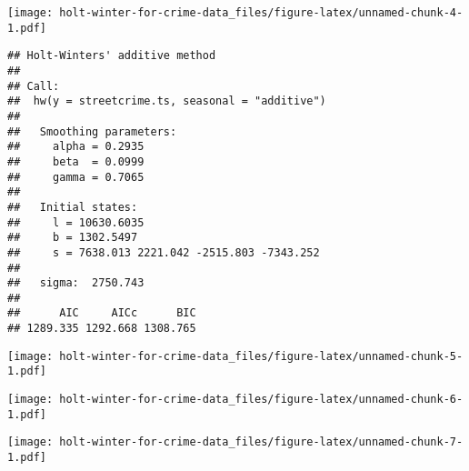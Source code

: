 \documentclass[]{article}
\newenvironment{Shaded}{\begin{snugshade}}{\end{snugshade}}
\newcommand{\CommentTok}[1]{\textcolor[rgb]{0.56,0.35,0.01}{\textit{#1}}}
\newcommand{\DataTypeTok}[1]{\textcolor[rgb]{0.13,0.29,0.53}{#1}}
\newcommand{\DecValTok}[1]{\textcolor[rgb]{0.00,0.00,0.81}{#1}}
\newcommand{\KeywordTok}[1]{\textcolor[rgb]{0.13,0.29,0.53}{\textbf{#1}}}
\newcommand{\NormalTok}[1]{#1}
\newcommand{\OperatorTok}[1]{\textcolor[rgb]{0.81,0.36,0.00}{\textbf{#1}}}
\newcommand{\StringTok}[1]{\textcolor[rgb]{0.31,0.60,0.02}{#1}}
\begin{document}
\texttt{[image: holt-winter-for-crime-data\_files/figure-latex/unnamed-chunk-4-1.pdf]}

\begin{Shaded}
\end{Shaded}

\begin{verbatim}
## Holt-Winters' additive method 
## 
## Call:
##  hw(y = streetcrime.ts, seasonal = "additive") 
## 
##   Smoothing parameters:
##     alpha = 0.2935 
##     beta  = 0.0999 
##     gamma = 0.7065 
## 
##   Initial states:
##     l = 10630.6035 
##     b = 1302.5497 
##     s = 7638.013 2221.042 -2515.803 -7343.252
## 
##   sigma:  2750.743
## 
##      AIC     AICc      BIC 
## 1289.335 1292.668 1308.765
\end{verbatim}

\begin{Shaded}
\end{Shaded}

\texttt{[image: holt-winter-for-crime-data\_files/figure-latex/unnamed-chunk-5-1.pdf]}

\begin{Shaded}
\end{Shaded}

\texttt{[image: holt-winter-for-crime-data\_files/figure-latex/unnamed-chunk-6-1.pdf]}

\begin{Shaded}
\end{Shaded}

\texttt{[image: holt-winter-for-crime-data\_files/figure-latex/unnamed-chunk-7-1.pdf]}
\end{document}
